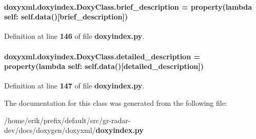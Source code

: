\paragraph[{brief\+\_\+description}]{\setlength{\rightskip}{0pt plus 5cm}doxyxml.\+doxyindex.\+Doxy\+Class.\+brief\+\_\+description = {\bf property}(lambda self\+: {\bf self.\+data}()[\textquotesingle{}brief\+\_\+description\textquotesingle{}])\hspace{0.3cm}{\ttfamily [static]}}\label{classdoxyxml_1_1doxyindex_1_1DoxyClass_ae258fefa82905cd309a35261eaa0f948}


Definition at line {\bf 146} of file {\bf doxyindex.\+py}.

\paragraph[{detailed\+\_\+description}]{\setlength{\rightskip}{0pt plus 5cm}doxyxml.\+doxyindex.\+Doxy\+Class.\+detailed\+\_\+description = {\bf property}(lambda self\+: {\bf self.\+data}()[\textquotesingle{}detailed\+\_\+description\textquotesingle{}])\hspace{0.3cm}{\ttfamily [static]}}\label{classdoxyxml_1_1doxyindex_1_1DoxyClass_a91e632dd0727d2a62473fb8d65eff9f7}


Definition at line {\bf 147} of file {\bf doxyindex.\+py}.



The documentation for this class was generated from the following file\+:\begin{DoxyCompactItemize}
\item 
/home/erik/prefix/default/src/gr-\/radar-\/dev/docs/doxygen/doxyxml/{\bf doxyindex.\+py}\end{DoxyCompactItemize}
